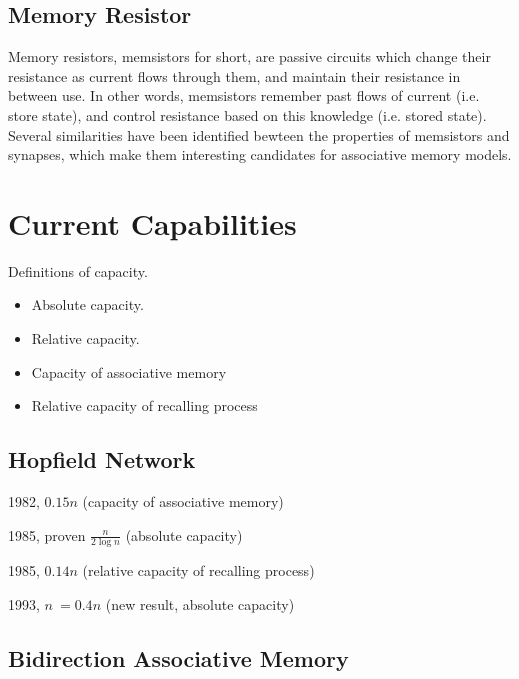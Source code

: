 \documentclass[12pt, a4paper]{article}
\begin{document}
\subsection{Memory Resistor}


Memory resistors, memsistors for short, are passive circuits which change their resistance as current flows through them, and maintain their resistance in between use. In other words, memsistors remember past flows of current (i.e. store state), and control resistance based on this knowledge (i.e. stored state). Several similarities have been identified bewteen the properties of memsistors and synapses, which make them interesting candidates for associative memory models.

\cite{memsistor} \cite{ahah}


\section{Current Capabilities}

Definitions of capacity.

\begin{itemize}
\item Absolute capacity.
\item Relative capacity.
\item Capacity of associative memory
\item Relative capacity of recalling process
\end{itemize}

\subsection{Hopfield Network}


1982, $0.15n$ (capacity of associative memory)


1985, proven $ \frac{n}{2\log{n}} $ (absolute capacity)

1985, $0.14n$ (relative capacity of recalling process)

1993, $ n ~= 0.4n $ (new result, absolute capacity)

\subsection{Bidirection Associative Memory}
\end{document}
